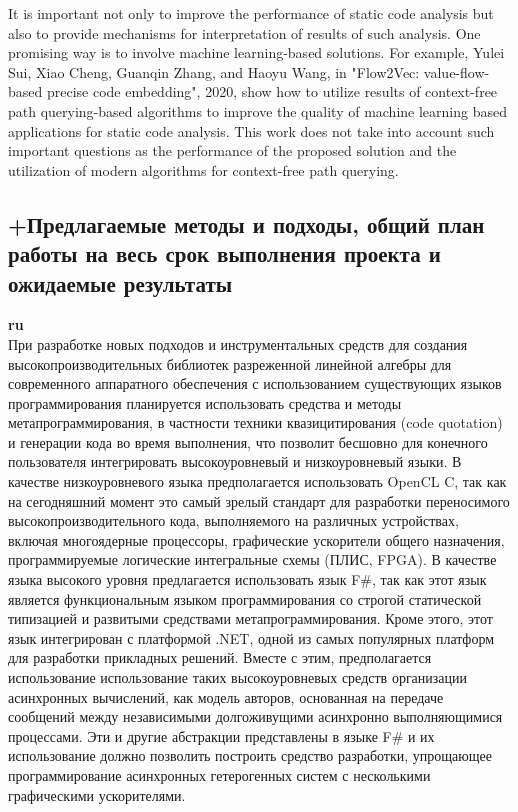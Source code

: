 \documentclass[12pt]{article}  %
\theoremstyle{remark}
\begin{document}
It is important not only to improve the performance of static code analysis but also to provide mechanisms for interpretation of results of such analysis. One promising way is to involve machine learning-based solutions. For example, Yulei Sui, Xiao Cheng, Guanqin Zhang, and Haoyu Wang, in "Flow2Vec: value-flow-based precise code embedding", 2020, show how to utilize results of context-free path querying-based algorithms to improve the quality of machine learning based applications for static code analysis. This work does not take into account such important questions as the performance of the proposed solution and the utilization of modern algorithms for context-free path querying. 


\subsection{+Предлагаемые методы и подходы, общий план работы на весь срок выполнения проекта и ожидаемые результаты }

\textbf{ru}\\

При разработке новых подходов и инструментальных средств для создания высокопроизводительных библиотек разреженной линейной алгебры для современного аппаратного обеспечения с использованием существующих языков программирования планируется использовать средства и методы метапрограммирования, в частности техники квазицитирования (code quotation) и генерации кода во время выполнения, что позволит бесшовно для конечного пользователя интегрировать высокоуровневый и низкоуровневый языки. В качестве низкоуровневого языка предполагается использовать OpenCL C, так как на сегодняшний момент это самый зрелый стандарт для разработки переносимого высокопроизводительного кода, выполняемого на различных устройствах, включая многоядерные процессоры, графические ускорители общего назначения, программируемые логические интегральные схемы (ПЛИС, FPGA). В качестве языка высокого уровня предлагается использовать язык F#, так как этот язык является функциональным языком программирования со строгой статической типизацией и развитыми средствами метапрограммирования. Кроме этого, этот язык интегрирован с платформой .NET, одной из самых популярных платформ для разработки прикладных решений. Вместе с этим, предполагается использование использование таких высокоуровневых средств организации асинхронных вычислений, как модель авторов, основанная на передаче сообщений между независимыми долгоживущими асинхронно выполняющимися процессами. Эти и другие абстракции представлены в языке F# и их использование должно позволить построить средство разработки, упрощающее программирование асинхронных гетерогенных систем с несколькими графическими ускорителями.
\end{document}
